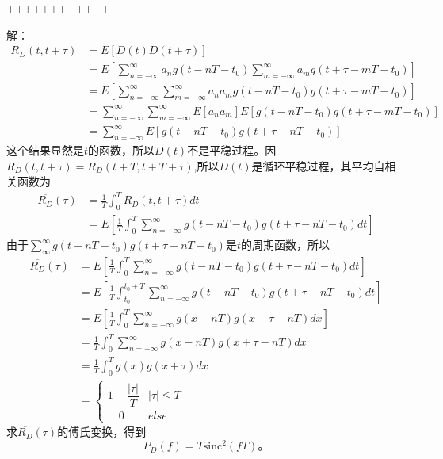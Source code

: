 \documentclass[utf8]{article}
\begin{document}
++++++++++++

解：
$$\begin{aligned}R_{D}\left(t,t+\tau\right)&=E\left[D\left(t\right)D\left(t+\tau\right)\right]\\&=E\left[\sum_{n=-\infty}^\infty a_ng\left(t-nT-t_0\right)\sum_{m=-\infty}^\infty a_mg\left(t+\tau-mT-t_0\right)\right]\\&=E\left[\sum_{n=-\infty}^\infty\sum_{m=-\infty}^\infty a_na_mg\left(t-nT-t_0\right)g\left(t+\tau-mT-t_0\right)\right]\\&=\sum_{n=-\infty}^\infty\sum_{m=-\infty}^\infty E\left[a_na_m\right]E\left[g\left(t-nT-t_0\right)g\left(t+\tau-mT-t_0\right)\right]\\&=\sum_{n=-\infty}^\infty E\left[g\left(t-nT-t_0\right)g\left(t+\tau-nT-t_0\right)\right]\end{aligned}$$
这个结果显然是$t$的函数，所以$D(t)$不是平稳过程。因$R_D\left(t,t+\tau\right)=R_D\left(t+T,t+T+\tau\right)$,所以$D(t)$是循环平稳过程，其平均自相关函数为
$$\begin{aligned}\overline{R_{D}}\left(\tau\right)&=\frac1T\int_0^TR_D\left(t,t+\tau\right)dt\\&=E\left[\frac1T\int_0^T\sum_{n=-\infty}^\infty g\left(t-nT-t_0\right)g\left(t+\tau-nT-t_0\right)dt\right]\end{aligned}$$
由于$\sum_{\infty}^{\infty}g\left(t-nT-t_0\right)g\left(t+\tau-nT-t_0\right)$是$t$的周期函数，所以
$$\begin{aligned}\overline{R_D}\left(\tau\right)&=E\left[\frac1T\int_0^T\sum_{n=-\infty}^\infty g\left(t-nT-t_0\right)g\left(t+\tau-nT-t_0\right)dt\right]\\&=E\left[\frac1T\int_{t_0}^{t_0+T}\sum_{n=-\infty}^\infty g\left(t-nT-t_0\right)g\left(t+\tau-nT-t_0\right)dt\right]\\&=E\left[\frac1T\int_0^T\sum_{n=-\infty}^\infty g\left(x-nT\right)g\left(x+\tau-nT\right)dx\right]\\&=\frac1T\int_0^T\sum_{n=-\infty}^\infty g\left(x-nT\right)g\left(x+\tau-nT\right)dx\\&=\frac1T\int_0^Tg\left(x\right)g\left(x+\tau\right)dx\\&=\begin{cases}1-\dfrac{\left|\tau\right|}{T}&\left|\tau\right|\leq T\\\quad0&else\end{cases}\end{aligned}$$
求$\overline{R_D}(\tau)$的傅氏变换，得到
$$P_D\left(f\right)=T\mathrm{sinc}^2\left(fT\right)。$$
\end{document}
